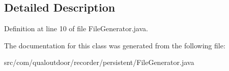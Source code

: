 \subsection{Detailed Description}


Definition at line 10 of file File\-Generator.\-java.



The documentation for this class was generated from the following file\-:\begin{DoxyCompactItemize}
\item 
src/com/qualoutdoor/recorder/persistent/File\-Generator.\-java\end{DoxyCompactItemize}
